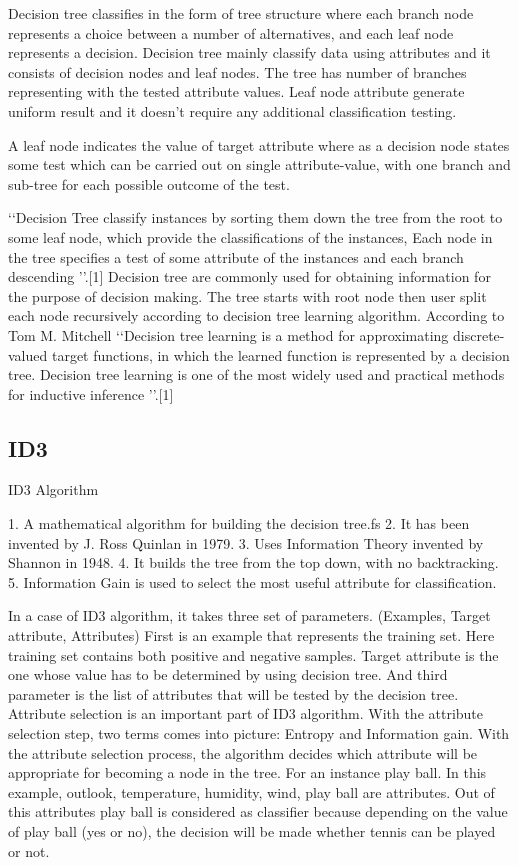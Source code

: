 \documentclass{article}
\begin{document}
Decision tree classifies in the form of tree structure where each branch node represents a choice between a number of alternatives, and each leaf node represents a decision. Decision tree mainly classify data using attributes and it consists of decision nodes and leaf nodes. The tree has number of branches representing with the tested attribute values.
Leaf node attribute generate uniform result and it doesn't require any additional classification testing.	

A leaf node indicates the value of target attribute where as a decision node states some test which can be carried out on single attribute-value, with one branch and sub-tree for each possible outcome of the test.

\lq\lq Decision Tree classify instances by sorting them down the tree from the root to some leaf node, which provide the classifications of the instances, Each node in the tree specifies a test of some attribute of the instances and each branch descending \rq\rq.[1]
Decision tree are commonly used for obtaining information for the purpose of decision making. The tree starts with root node then user split each node recursively according to decision tree learning algorithm.
According to Tom M. Mitchell \lq\lq Decision tree learning is a method for approximating discrete-valued target functions, in which the learned function is represented by a decision tree. Decision tree learning is one of the most widely used and practical methods for inductive inference \rq\rq.[1]

\subsection{ID3}
\label{sec:ID3}

ID3 Algorithm

1. A mathematical algorithm for building the decision tree.fs
2. It has been invented by J. Ross Quinlan in 1979.
3. Uses Information Theory invented by Shannon in 1948.
4. It builds the tree from the top down, with no backtracking.
5. Information Gain is used to select the most useful attribute for classification.

In a case of ID3 algorithm, it takes three set of parameters.
(Examples, Target attribute, Attributes)
First is an example that represents the training set. Here training set contains both positive and negative samples. Target attribute is the one whose value has to be determined by using decision tree. And third parameter is the list of attributes that will be tested by the decision tree. Attribute selection is an important part of ID3 algorithm. With the attribute selection step, two terms comes into picture: Entropy and Information gain. With the attribute selection process, the algorithm decides which attribute will be appropriate for becoming a node in the tree. 
For an instance play ball. In this example, outlook, temperature, humidity, wind, play ball are attributes. Out of this attributes play ball is considered as classifier because depending on the value of play ball (yes or no), the decision will be made whether tennis can be played or not.    
\end{document}
